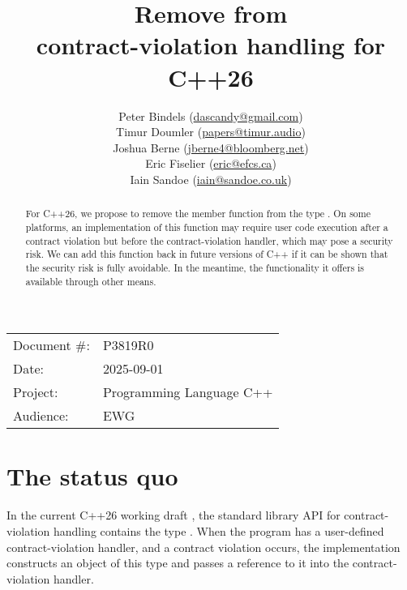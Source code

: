 

 \usepackage[bottom]{footmisc} 



\title{Remove  from \\ contract-violation handling for C++26}
\author{
  Peter Bindels \small(\href{mailto:dascandy@gmail.com}{dascandy@gmail.com}) \\
  Timur Doumler \small(\href{mailto:papers@timur.audio}{papers@timur.audio}) \\
  Joshua Berne \small(\href{mailto:jberne4@bloomberg.net}{jberne4@bloomberg.net}) \\ 
  Eric Fiselier \small(\href{mailto:eric@efcs.ca}{eric@efcs.ca}) \\
  Iain Sandoe \small(\href{mailto:iain@sandoe.co.uk}{iain@sandoe.co.uk})
}
\date{}
\maketitle

\begin{tabular}{ll}
Document \#: & P3819R0 \\
Date: &2025-09-01 \\
Project: & Programming Language C++ \\
Audience: & EWG
\end{tabular}

\begin{abstract}
For C++26, we propose to remove the member function  from the type . On some platforms, an implementation of this function may require user code execution after a contract violation but before the contract-violation handler, which may pose a security risk. We can add this function back in future versions of C++ if it can be shown that the security risk is fully avoidable. In the meantime, the functionality it offers is available through other means.
\end{abstract}


\section{The status quo}

In the current C++26 working draft \cite{N5014}, the standard library API for contract-violation handling contains the type . When the program has a user-defined contract-violation handler, and a contract violation occurs, the implementation constructs an object of this type and passes a reference to it into the contract-violation handler.

